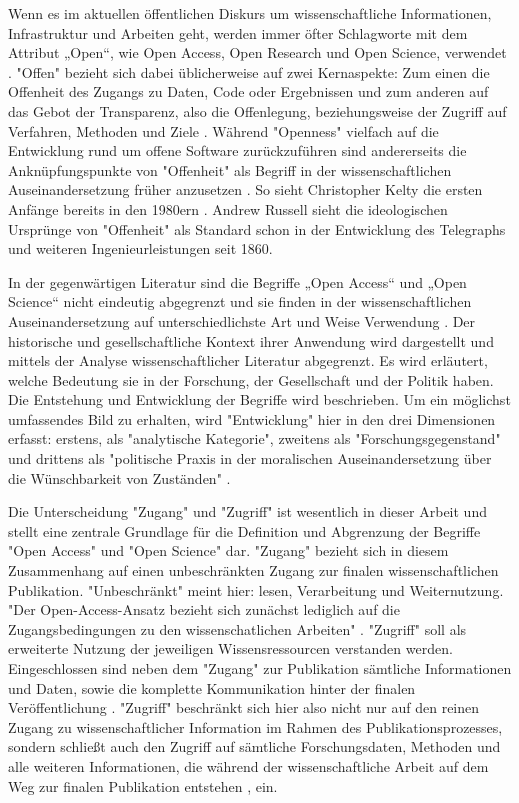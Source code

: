 Wenn es im aktuellen öffentlichen Diskurs um wissenschaftliche Informationen, Infrastruktur und Arbeiten geht, werden immer öfter Schlagworte mit dem Attribut „Open“, wie Open Access, Open Research und Open Science, verwendet \cite{bunz_2014} \cite{schulze_2013_open}. "Offen" bezieht sich dabei üblicherweise auf zwei Kernaspekte: Zum einen die Offenheit des Zugangs zu Daten, Code oder Ergebnissen und zum anderen auf das Gebot der Transparenz, also die Offenlegung, beziehungsweise der Zugriff auf Verfahren, Methoden und Ziele \cite{schulze_2013_open}. Während "Openness" vielfach auf die Entwicklung rund um offene Software zurückzuführen sind andererseits die Anknüpfungspunkte von "Offenheit" als Begriff in der wissenschaftlichen Auseinandersetzung früher anzusetzen \cite{Tkacz_2014}. So sieht Christopher Kel­ty die ersten Anfänge bereits in den 1980ern \cite{kelty_2008_two_bits}. Andrew Russell sieht die ideologischen Ursprünge von "Offenheit" als Standard schon in der Entwicklung des Telegraphs und weiteren Ingenieurleistungen seit 1860\cite{Russell_2014}.

In der gegenwärtigen Literatur sind die Begriffe „Open Access“ und „Open Science“ nicht eindeutig abgegrenzt und sie finden in der wissenschaftlichen Auseinandersetzung auf unterschiedlichste Art und Weise Verwendung \cite{cite:9}. Der historische und gesellschaftliche Kontext ihrer Anwendung wird dargestellt und mittels der Analyse wissenschaftlicher Literatur abgegrenzt. Es wird erläutert, welche Bedeutung sie in der Forschung, der Gesellschaft und der Politik haben. Die Entstehung und Entwicklung der Begriffe wird beschrieben. Um ein möglichst umfassendes Bild zu erhalten, wird "Entwicklung" hier in den drei Dimensionen erfasst: erstens, als "analytische Kategorie", zweitens als "Forschungsgegenstand" und drittens als "politische Praxis in der moralischen Auseinandersetzung über die Wünschbarkeit von Zuständen" \cite{cite:10}.

Die Unterscheidung "Zugang" und "Zugriff" ist wesentlich in dieser Arbeit und stellt eine zentrale Grundlage für die Definition und Abgrenzung der Begriffe "Open Access" und "Open Science" dar. "Zugang" bezieht sich in diesem Zusammenhang auf einen unbeschränkten Zugang zur finalen wissenschaftlichen Publikation. "Unbeschränkt" meint hier: lesen\cite{cite:9a}, Verarbeitung und Weiternutzung. "Der Open-Access-Ansatz bezieht sich zunächst lediglich auf die Zugangsbedingungen zu den wissenschatlichen Arbeiten" \cite{muller_2010_open}. "Zugriff" soll als erweiterte Nutzung der jeweiligen Wissensressourcen verstanden werden. Eingeschlossen sind neben dem "Zugang" zur Publikation sämtliche Informationen und Daten, sowie die komplette Kommunikation hinter der finalen Veröffentlichung \cite{cite:9b}. "Zugriff" beschränkt sich hier also nicht nur auf den reinen Zugang zu wissenschaftlicher Information im Rahmen des Publikationsprozesses, sondern schließt auch den Zugriff auf sämtliche Forschungsdaten, Methoden und alle weiteren Informationen, die während der wissenschaftliche Arbeit auf dem Weg zur finalen Publikation entstehen \cite{cite:9c}, ein.

